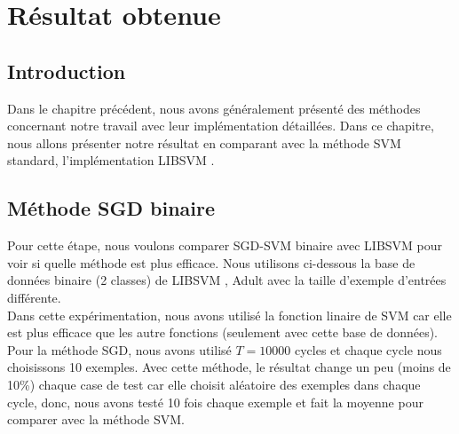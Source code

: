 \chapter{Résultat obtenue}
\label{chap:res}

\section{Introduction}
Dans le chapitre précédent, nous avons généralement présenté des méthodes concernant notre travail avec leur implémentation détaillées. Dans ce chapitre, nous allons présenter notre résultat en comparant avec la méthode SVM standard, l'implémentation LIBSVM \cite{cl01}.

\section{Méthode SGD binaire}
Pour cette étape, nous voulons comparer SGD-SVM binaire avec LIBSVM pour voir si quelle méthode est plus efficace. Nous utilisons ci-dessous la base de données binaire (2 classes) de LIBSVM \cite{svmdata1}, Adult avec la taille d'exemple d'entrées différente.\\

Dans cette expérimentation, nous avons utilisé la fonction linaire de SVM car elle est plus efficace que les autre fonctions (seulement avec cette base de données). Pour la méthode SGD, nous avons utilisé $T = 10000$ cycles et chaque cycle nous choisissons 10 exemples. Avec cette méthode, le résultat change un peu (moins de 10\%) chaque case de test car elle choisit aléatoire des exemples dans chaque cycle, donc, nous avons testé 10 fois chaque exemple et fait la moyenne pour comparer avec la méthode SVM.

